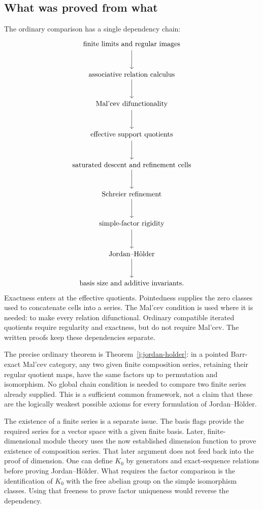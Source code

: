 \documentclass[11pt]{article}
\theoremstyle{definition}
\theoremstyle{remark}\newtheorem{remark}[theorem]{Remark}
\begin{document}
\subsection{What was proved from what}

The ordinary comparison has a single dependency chain:
\[
\begin{tikzcd}[column sep=small,row sep=large]
\text{finite limits and regular images}\arrow[d]\\
\text{associative relation calculus}\arrow[d]\\
\text{Mal'cev difunctionality}\arrow[d]\\
\text{effective support quotients}\arrow[d]\\
\text{saturated descent and refinement cells}\arrow[d]\\
\text{Schreier refinement}\arrow[d]\\
\text{simple-factor rigidity}\arrow[d]\\
\text{Jordan--H\"older}\arrow[d]\\
\text{basis size and additive invariants}.
\end{tikzcd}
\]
Exactness enters at the effective quotients. Pointedness supplies the zero
classes used to concatenate cells into a series. The Mal'cev condition is
used where it is needed: to make every relation difunctional. Ordinary
compatible iterated quotients require regularity and exactness, but do not
require Mal'cev. The written proofs keep these dependencies separate.

The precise ordinary theorem is Theorem~\ref{j:jordan-holder}: in a
pointed Barr-exact Mal'cev category, any two given finite composition
series, retaining their regular quotient maps, have the same factors up
to permutation and isomorphism. No global chain condition is needed to
compare two finite series already supplied. This is a sufficient common
framework, not a claim that these are the logically weakest possible
axioms for every formulation of Jordan--H\"older.

The existence of a finite series is a separate issue. The basis flags
provide the required series for a vector space with a given finite basis.
Later, finite-dimensional module theory uses the now established dimension
function to prove existence of composition series. That later argument
does not feed back into the proof of dimension. One can define $K_0$ by
generators and exact-sequence relations before proving Jordan--H\"older.
What requires the factor comparison is the identification of $K_0$ with
the free abelian group on the simple isomorphism classes. Using that
freeness to prove factor uniqueness would reverse the dependency.
\end{document}
